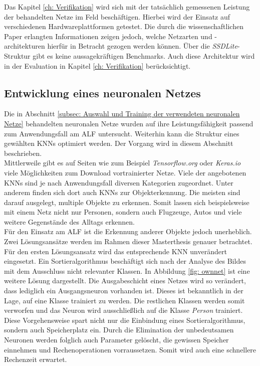 		Das Kapitel \ref{ch: Verifikation} wird sich mit der tatsächlich gemessenen Leistung der behandelten Netze im Feld beschäftigen. Hierbei wird der Einsatz auf verschiedenen Hardwareplattformen getestet. Die durch die wissenschaftlichen Paper erlangten Informationen zeigen jedoch, welche Netzarten und -architekturen hierfür in Betracht gezogen werden können. Über die \textit{SSDLite}-Struktur gibt es keine aussagekräftigen Benchmarks. Auch diese Architektur wird in der Evaluation in Kapitel \ref{ch: Verifikation} berücksichtigt.
		
		\subsection{Entwicklung eines neuronalen Netzes}
		\label{subsec: Entwickeltes neuronales Netz}
		
		Die in Abschnitt \ref{subsec: Auswahl und Training der verwendeten neuronalen Netze} behandelten neuronalen Netze wurden auf ihre Leistungsfähigkeit passend zum Anwendungsfall am ALF untersucht. Weiterhin kann die Struktur eines gewählten KNNs optimiert werden. Der Vorgang wird in diesem Abschnitt beschrieben.\\
		
		Mittlerweile gibt es auf Seiten wie zum Beispiel \textit{Tensorflow.org} oder \textit{Keras.io} viele Möglichkeiten zum Download vortrainierter Netze. Viele der angebotenen KNNs sind je nach Anwendungsfall diversen Kategorien zugeordnet. Unter anderem finden sich dort auch KNNs zur Objekterkennung. Die meisten sind darauf ausgelegt, multiple Objekte zu erkennen. Somit lassen sich beispielsweise mit einem Netz nicht nur Personen, sondern auch Flugzeuge, Autos und viele weitere Gegenstände des Alltags erkennen. \\ 
		
		
		
		Für den Einsatz am ALF ist die Erkennung anderer Objekte jedoch unerheblich. Zwei Lösungsansätze werden im Rahmen dieser Masterthesis genauer betrachtet. Für den ersten Lösungsansatz wird das entsprechende KNN unverändert eingesetzt. Ein Sortieralgorithmus beschäftigt sich nach der Analyse des Bildes mit dem Ausschluss nicht relevanter Klassen. In Abbildung \ref{fig: ownnet} ist eine weitere Lösung dargestellt. Die Ausgabeschicht eines Netzes wird so verändert, dass lediglich ein Ausgangsneuron vorhanden ist. Dieses ist bekanntlich in der Lage, auf eine Klasse trainiert zu werden. Die restlichen Klassen werden somit verworfen und das Neuron wird ausschließlich auf die Klasse \textit{Person} trainiert. Diese Vorgehensweise spart nicht nur die Einbindung eines Sortieralgorithmus, sondern auch Speicherplatz ein. Durch die Elimination der unbedeutsamen Neuronen werden folglich auch Parameter gelöscht, die gewissen Speicher einnehmen und Rechenoperationen vorraussetzen. Somit wird auch eine schnellere Rechenzeit erwartet. \\
		
